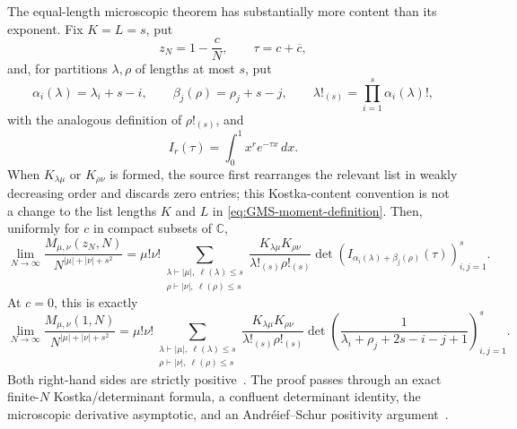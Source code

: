 The equal-length microscopic theorem has substantially more content than its exponent.  Fix
$K=L=s$, put
\begin{equation}
 z_N=1-\frac{c}{N},\qquad \tau=c+\overline c,
\end{equation}
and, for partitions $\lambda,\rho$ of lengths at most $s$, put
\begin{equation}
 \alpha_i(\lambda)=\lambda_i+s-i,\qquad
 \beta_j(\rho)=\rho_j+s-j,\qquad
 \lambda!_{(s)}=\prod_{i=1}^{s}\alpha_i(\lambda)!,
\end{equation}
with the analogous definition of $\rho!_{(s)}$, and
\begin{equation}
 I_r(\tau)=\int_0^1x^r e^{-\tau x}\,dx.
\end{equation}
When $K_{\lambda\mu}$ or $K_{\rho\nu}$ is formed, the source first rearranges the relevant
list in weakly decreasing order and discards zero entries; this Kostka-content convention is
not a change to the list lengths $K$ and $L$ in \eqref{eq:GMS-moment-definition}.
Then, uniformly for $c$ in compact subsets of $\mathbb C$,
\begin{equation}
 \lim_{N\to\infty}
 \frac{M_{\mu,\nu}(z_N,N)}{N^{|\mu|+|\nu|+s^2}}
 =\mu!\nu!
 \sum_{\substack{\lambda\vdash|\mu|,\ \ell(\lambda)\le s\\
                   \rho\vdash|\nu|,\ \ell(\rho)\le s}}
 \frac{K_{\lambda\mu}K_{\rho\nu}}{\lambda!_{(s)}\rho!_{(s)}}
 \det\!\left(I_{\alpha_i(\lambda)+\beta_j(\rho)}(\tau)\right)_{i,j=1}^{s}.
 \label{eq:GMS-microscopic-equal}
\end{equation}
At $c=0$, this is exactly
\begin{equation}
 \lim_{N\to\infty}
 \frac{M_{\mu,\nu}(1,N)}{N^{|\mu|+|\nu|+s^2}}
 =\mu!\nu!
 \sum_{\substack{\lambda\vdash|\mu|,\ \ell(\lambda)\le s\\
                   \rho\vdash|\nu|,\ \ell(\rho)\le s}}
 \frac{K_{\lambda\mu}K_{\rho\nu}}{\lambda!_{(s)}\rho!_{(s)}}
 \det\!\left(
 \frac{1}{\lambda_i+\rho_j+2s-i-j+1}
 \right)_{i,j=1}^{s}.
 \label{eq:GMS-microscopic-circle}
\end{equation}
Both right-hand sides are strictly positive~\cite[Thm.~1.2]{groverMezzadriSimm2026}.
The proof passes through an exact finite-$N$ Kostka/determinant formula, a confluent
determinant identity, the microscopic derivative asymptotic, and an Andr\'eief--Schur
positivity argument~\cite[Sec.~2]{groverMezzadriSimm2026}.

